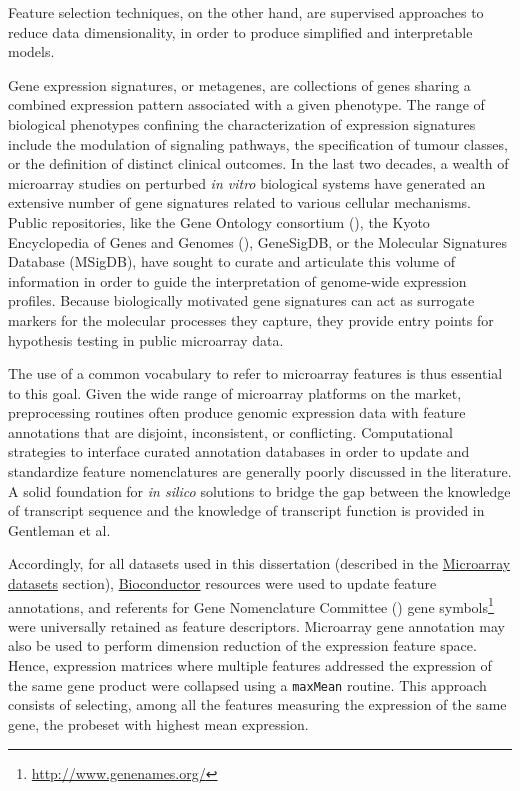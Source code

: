 Feature selection techniques, on the other hand, are supervised approaches to
reduce data dimensionality, in order to produce simplified and interpretable
models.  %

Gene expression signatures, or metagenes, are collections of genes sharing a
combined expression pattern associated with a given phenotype.  The range of
biological phenotypes confining the characterization of expression signatures
include the modulation of signaling pathways,\cite{itadani_can_2008} the
specification of tumour classes,\cite{ramaswamy_multiclass_2001} or the
definition of distinct clinical outcomes.\cite{vant_veer_gene_2002} In the last
two decades, a wealth of microarray studies on perturbed \emph{in vitro}
biological systems have generated an extensive number of gene signatures related
to various cellular mechanisms.\cite{chibon_cancer_2013} Public repositories,
like the Gene Ontology consortium (),\cite{ashburner_gene_2000}
the Kyoto Encyclopedia of Genes and Genomes
(),\cite{kanehisa_kegg:_2000}
\mbox{GeneSigDB},\cite{culhane_genesigdb:_2012} or the Molecular Signatures
Database (\mbox{MSigDB}),\cite{subramanian_gene_2005} have sought to curate and
articulate this volume of information in order to guide the interpretation of
genome-wide expression profiles.  Because biologically motivated gene signatures
can act as surrogate markers for the molecular processes they capture, they
provide entry points for hypothesis testing in public microarray data.

The use of a common vocabulary to refer to microarray features is thus essential
to this goal.  Given the wide range of microarray platforms on the market,
preprocessing routines often produce genomic expression data with feature
annotations that are disjoint, inconsistent, or conflicting.  Computational
strategies to interface curated annotation databases in order to update and
standardize feature nomenclatures are generally poorly discussed in the
literature.  A solid foundation for \emph{in silico} solutions to bridge the gap
between the knowledge of transcript sequence and the knowledge of transcript
function is provided in Gentleman et al.\cite{gentleman_bioinformatics_2006}

Accordingly, for all datasets used in this dissertation (described in the
\hyperref[sec:methods-datasets]{\textsf{Microarray datasets}} section),
\href{http://www.bioconductor.org/}{\textsf{Bioconductor}} resources were used
to update feature annotations, and referents for  Gene
Nomenclature Committee () gene
symbols\footnote{\href{http://www.genenames.org/}{http://www.genenames.org/}}
were universally retained as feature descriptors.  Microarray gene annotation
may also be used to perform dimension reduction of the expression feature space.
Hence, expression matrices where multiple features addressed the expression of
the same gene product were collapsed using a \texttt{maxMean}
routine.\cite{miller_strategies_2011} This approach consists of selecting, among
all the features measuring the expression of the same gene, the probeset with
highest mean expression.

